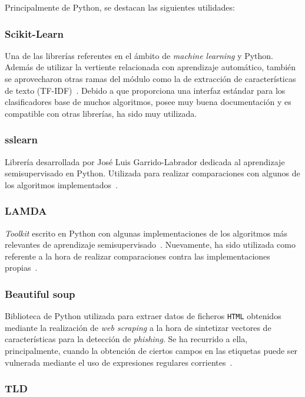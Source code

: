 Principalmente de Python, se destacan las siguientes utilidades:
\subsubsection{Scikit-Learn}

Una de las librerías referentes en el ámbito de \textit{machine learning} y Python. Además de utilizar la vertiente relacionada con aprendizaje automático, también se aprovecharon otras ramas del módulo como la de extracción de características de texto (TF-IDF)~\cite{sslearnRepo}. Debido a que proporciona una interfaz estándar para los clasificadores base de muchos algoritmos, posee muy buena documentación y es compatible con otras librerías, ha sido muy utilizada.

\subsubsection{sslearn}

Librería desarrollada por José Luis Garrido-Labrador dedicada al aprendizaje semisupervisado en Python. Utilizada para realizar comparaciones con algunos de los algoritmos implementados~\cite{sslearnRepo}.

\subsubsection{LAMDA}

\textit{Toolkit} escrito en Python con algunas implementaciones de los algoritmos más relevantes de aprendizaje semisupervisado~\cite{lamdasslRepo}. Nuevamente, ha sido utilizada como referente a la hora de realizar comparaciones contra las implementaciones propias~\cite{lamdasslPaper}.

\subsubsection{Beautiful soup}

Biblioteca de Python utilizada para extraer datos de ficheros \texttt{HTML} obtenidos mediante la realización de \textit{web scraping} a la hora de sintetizar vectores de características para la detección de \textit{phishing}. Se ha recurrido a ella, principalmente, cuando la obtención de ciertos campos en las etiquetas puede ser vulnerada mediante el uso de expresiones regulares corrientes~\cite{bs4Docs}.

\subsubsection{TLD}

